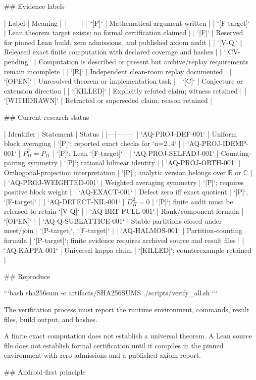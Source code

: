 ## Evidence labels

| Label | Meaning |
|---|---|
| `[P]` | Mathematical argument written |
| `[F-target]` | Lean theorem target exists; no formal certification claimed |
| `[F]` | Reserved for pinned Lean build, zero admissions, and published axiom audit |
| `[V-Q]` | Released exact finite computation with declared coverage and hashes |
| `[CV-pending]` | Computation is described or present but archive/replay requirements remain incomplete |
| `[R]` | Independent clean-room replay documented |
| `[OPEN]` | Unresolved theorem or implementation task |
| `[C]` | Conjecture or extension direction |
| `[KILLED]` | Explicitly refuted claim; witness retained |
| `[WITHDRAWN]` | Retracted or superseded claim; reason retained |

## Current research status

| Identifier | Statement | Status |
|---|---|---|
| `AQ-PROJ-DEF-001` | Uniform block averaging | `[P]`; reported exact checks for `n=2..4` |
| `AQ-PROJ-IDEMP-001` | \(P_\Pi^2=P_\Pi\) | `[P]`; Lean `[F-target]` |
| `AQ-PROJ-SELFADJ-001` | Counting-pairing symmetry | `[P]`; rational bilinear identity |
| `AQ-PROJ-ORTH-001` | Orthogonal-projection interpretation | `[P]`; analytic version belongs over \(\mathbb R\) or \(\mathbb C\) |
| `AQ-PROJ-WEIGHTED-001` | Weighted averaging symmetry | `[P]`; requires positive block weight |
| `AQ-EXACT-001` | Defect zero iff exact quotient | `[P]`, `[F-target]` |
| `AQ-DEFECT-NIL-001` | \(D_\Pi^2=0\) | `[P]`; finite audit must be released to retain `[V-Q]` |
| `AQ-BRT-FULL-001` | Rank/component formula | `[OPEN]` |
| `AQ-Q-SUBLATTICE-001` | Stable partitions closed under meet/join | `[P-target]`, `[F-target]` |
| `AQ-HALMOS-001` | Partition-counting formula | `[P-target]`; finite evidence requires archived source and result files |
| `AQ-KAPPA-001` | Universal kappa claim | `[KILLED]`; counterexample retained |

## Reproduce

```bash
sha256sum -c artifacts/SHA256SUMS
./scripts/verify_all.sh
```

The verification process must report the runtime environment, commands, result files, build output, and hashes.

A finite exact computation does not establish a universal theorem. A Lean source file does not establish formal certification until it compiles in the pinned environment with zero admissions and a published axiom report.

## Android-first principle

